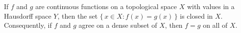 If $f$ and $g$ are continuous functions on a topological space $X$ with values in a Hausdorff space $Y$, then the set $\{\, x \in X : f(x) = g(x) \,\}$ is closed in $X$. Consequently, if $f$ and $g$ agree on a dense subset of $X$, then $f = g$ on all of $X$.
